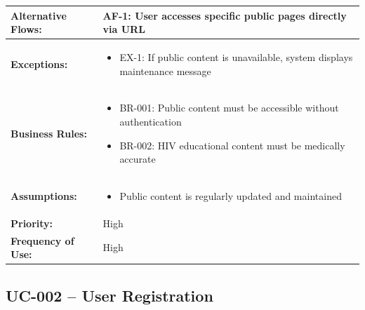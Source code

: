 \documentclass[12pt,a4paper]{article}
\begin{document}
\begin{longtable}{|p{4.5cm}|p{10.5cm}|}
\hline
\textbf{Alternative Flows:} & 
\textbf{AF-1:} User accesses specific public pages directly via URL \\
\hline
\textbf{Exceptions:} &
\begin{itemize}
  \item EX-1: If public content is unavailable, system displays maintenance message
\end{itemize} \\
\hline
\textbf{Business Rules:} &
\begin{itemize}
  \item BR-001: Public content must be accessible without authentication
  \item BR-002: HIV educational content must be medically accurate
\end{itemize} \\
\hline
\textbf{Assumptions:} &
\begin{itemize}
  \item Public content is regularly updated and maintained
\end{itemize} \\
\hline
\textbf{Priority:} & High \\
\hline
\textbf{Frequency of Use:} & High \\
\hline
\end{longtable}

\subsection{UC-002 – User Registration}
\end{document}
